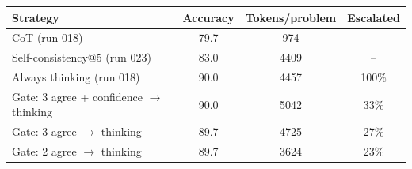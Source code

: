 \begin{tabular}{lccc}
\toprule
Strategy & Accuracy & Tokens/problem & Escalated \\
\midrule
CoT (run 018) & 79.7 & 974 & -- \\
Self-consistency@5 (run 023) & 83.0 & 4409 & -- \\
Always thinking (run 018) & 90.0 & 4457 & 100\% \\
Gate: 3 agree + confidence $\rightarrow$ thinking & 90.0 & 5042 & 33\% \\
Gate: 3 agree $\rightarrow$ thinking & 89.7 & 4725 & 27\% \\
Gate: 2 agree $\rightarrow$ thinking & 89.7 & 3624 & 23\% \\
\bottomrule
\end{tabular}
